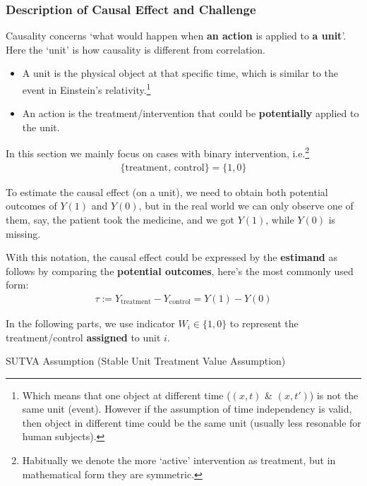 \subsubsection{Description of Causal Effect and Challenge}
    Causality concerns `what would happen when \textbf{an action} is applied to \textbf{a unit}'. Here the `unit' is how causality is different from correlation.
\begin{itemize}[topsep=2pt,itemsep=0pt]
    \item A unit is the physical object at that specific time, which is similar to the event in Einstein's relativity.\footnote{Which means that one object at different time ($ (x,t) $ \& $ (x,t') $) is not the same unit (event). However if the assumption of time independency is valid, then object in different time could be the same unit (usually less resonable for human subjects).}
    \item An action is the treatment/intervention that could be \textbf{potentially} applied to the unit. 
\end{itemize}

    In this section we mainly focus on cases with binary intervention, i.e.\footnote{Habitually we denote the more `active' intervention as treatment, but in mathematical form they are symmetric.}
    \begin{align*}
        \{\mathrm{treatment},\,\mathrm{control} \}=\{1,0\} 
    \end{align*}

    To estimate the causal effect (on a unit), we need to obtain both potential outcomes of $ Y(1) $ and $ Y(0) $, but in the real world we can only observe one of them, say, the patient took the medicine, and we got $ Y(1) $, while $ Y(0) $ is missing.

    With this notation, the causal effect could be expressed by the \textbf{estimand} as follows by  comparing the \textbf{potential outcomes}, here's the most commonly used form:
    \begin{align*}
        \tau:=Y_\mathrm{treatment} -Y_\mathrm{control} =Y(1)-Y(0)
    \end{align*}

    In the following parts, we use indicator $ W_i\in\{1,0\} $ to represent the treatment/control \textbf{assigned} to unit $ i $.

\begin{point}
    SUTVA Assumption (Stable Unit Treatment Value Assumption)
\end{point}

